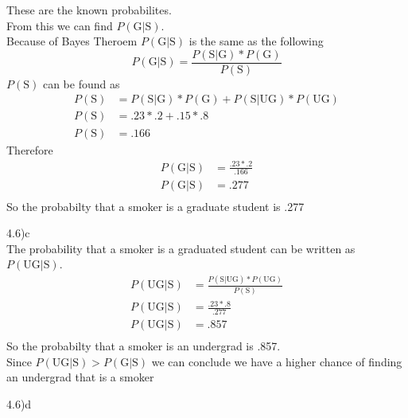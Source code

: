 \documentclass[12pt,english]{article}
\begin{document}
These are the known probabilites.\\
 From this we can find $P(\mbox{G}\vert \mbox{S})$.\\
Because of Bayes Theroem  $P(\mbox{G}\vert \mbox{S})$ is the same as the following
\begin{equation}
P(\mbox{G}\vert \mbox{S}) = \frac{P(\mbox{S} \vert \mbox{G}) * P(\mbox{G})}{P(\mbox{S})}
\end{equation}
$P(\mbox{S})$ can be found as
\begin{equation}
\begin{split}
P(\mbox{S}) &=  P(\mbox{S} \vert \mbox{G}) * P(\mbox{G}) + P(\mbox{S} \vert \mbox{UG}) * P(\mbox{UG})\\
P(\mbox{S}) &= .23 *.2 + .15 * .8\\
P(\mbox{S}) &=.166
\end{split}
\end{equation}
Therefore
\begin{equation}
\begin{split}
P(\mbox{G}\vert \mbox{S}) &= \frac{.23 * .2}{.166}\\
P(\mbox{G}\vert \mbox{S}) &= .277\\
\end{split}
\end{equation}
 So the probabilty that a smoker is a graduate student is .277\par
 4.6)c\\
The probability that a smoker is a graduated student  can be written as  $P(\mbox{UG}\vert \mbox{S})$.\\
\begin{equation}
\begin{split}
P(\mbox{UG}\vert \mbox{S}) &=  \frac{P(\mbox{S} \vert \mbox{UG}) * P(\mbox{UG})}{P(\mbox{S})}\\
P(\mbox{UG}\vert \mbox{S}) &=\frac{.23 * .8}{.277}\\
P(\mbox{UG}\vert \mbox{S}) &=.857\\
\end{split}
\end{equation}
 So the probabilty that a smoker is an undergrad is  .857.\\
 Since $P(\mbox{UG}\vert \mbox{S}) > P(\mbox{G}\vert \mbox{S})$ 
 we can conclude we have a higher chance of finding an undergrad that is a smoker\par
 4.6)d\\
\end{document}
